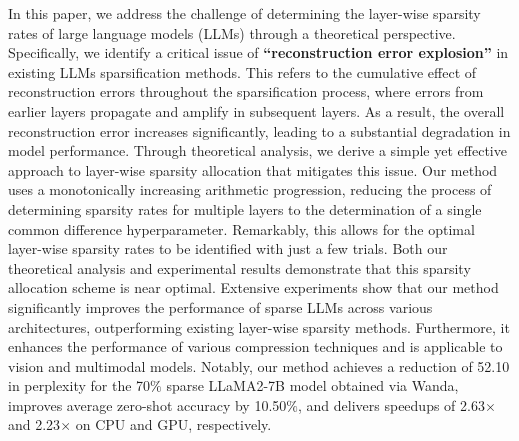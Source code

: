 In this paper, we address the challenge of determining the layer-wise sparsity rates of large language models (LLMs) through a theoretical perspective. Specifically, we identify a critical issue of \textbf{``reconstruction error explosion''} in existing LLMs sparsification methods. This refers to the cumulative effect of reconstruction errors throughout the sparsification process, where errors from earlier layers propagate and amplify in subsequent layers. As a result, the overall reconstruction error increases significantly, leading to a substantial degradation in model performance.
Through theoretical analysis, we derive a simple yet effective approach to layer-wise sparsity allocation that mitigates this issue. Our method uses a monotonically increasing arithmetic progression, reducing the process of determining sparsity rates for multiple layers to the determination of a single common difference hyperparameter. Remarkably, this allows for the optimal layer-wise sparsity rates to be identified with just a few trials. Both our theoretical analysis and experimental results demonstrate that this sparsity allocation scheme is near optimal.
Extensive experiments show that our method significantly improves the performance of sparse LLMs across various architectures, outperforming existing layer-wise sparsity methods. Furthermore, it enhances the performance of various compression techniques and is applicable to vision and multimodal models. Notably, our method achieves a reduction of 52.10 in perplexity for the 70$\%$ sparse LLaMA2-7B model obtained via Wanda, improves average zero-shot accuracy by 10.50$\%$, and delivers speedups of 2.63$\times$ and 2.23$\times$ on CPU and GPU, respectively.